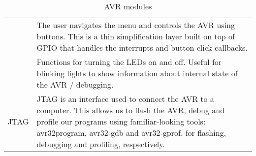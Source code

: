\begin{table}[htbp]
\begin{tabular}{l|p{10cm}}
\begin{comment}
	\hline
	Button & The user navigates the menu and controls the AVR using buttons. This is
	a thin simplification layer built on top of GPIO that handles the
	interrupts and button click callbacks. \CHECK{this does not exists as of
	right now, but it might in the future :)}\\
\end{comment}
	LEDs & Functions for turning the LEDs on and off. Useful for
	blinking lights to show information about internal state of the AVR / debugging. \\
	\hline
	JTAG & JTAG is an interface used to connect the AVR to a computer. This
	allows us to flash the AVR, debug and profile our programs using
	familiar-looking tools: avr32program, avr32-gdb and avr32-gprof,
	for flashing, debugging and profiling, respectively. \\
\end{tabular}
\caption{AVR modules}
\label{tab:asdasd}
\end{table}
\begin{comment}
\TODO{FAT: reference to comparison benchmarks in appendix?}
\TODO{FGPA/GPIO: more?}
\TODO{Button: predictive writing is never a good idea, that's a surefire way of ending up with outright wrong/contradictive things in our report.}
\TODO{Program: This isn't really a library then, is it?}
\TODO{BMP: Should we remove it? It was like a 10 minute job to make and is utterly useless now...} 
\TODO{SMC/EBI: What? The INTERNAL sram is on the EXTERNAL bus interface? That makes no sense!}
\TODO{JTAG: what use have we had of avr32-gdb and avr32-gprof? Is use of these described in the report? if not why are we mentioning them?}
\end{comment}
